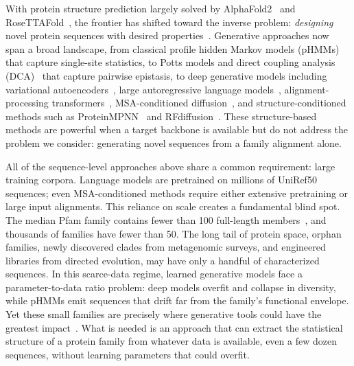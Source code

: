 
With protein structure prediction largely solved by AlphaFold2~\cite{jumperHighlyAccurateProtein2021} and RoseTTAFold~\cite{baekRoseTTAFold2021}, the frontier has shifted toward the inverse problem: \emph{designing} novel protein sequences with desired properties~\cite{kuhlmanBradleyAdvances2019,huangComingAgeDeNovo2016}. Generative approaches now span a broad landscape, from classical profile hidden Markov models (pHMMs)~\cite{hmmer3,kroghHiddenMarkovModels1994} that capture single-site statistics, to Potts models and direct coupling analysis (DCA)~\cite{morcosDirectCouplingAnalysis2011,ekeberg2013improved,trinquierEfficientGenerativeModeling2021} that capture pairwise epistasis, to deep generative models including variational autoencoders~\cite{kingmaWellingAutoEncoding2014,riesselman2018deep,sinaiVariationalAutoEncoding2017}, large autoregressive language models~\cite{ferruzProtGPT2DeepUnsupervised2022,madaniProGenLanguageModeling2023,notinTranception2022}, alignment-processing transformers~\cite{raoMSATransformer2021}, MSA-conditioned diffusion~\cite{alamdariProteinGeneration2023}, and structure-conditioned methods such as ProteinMPNN~\cite{dauparasProteinMPNN2022} and RFdiffusion~\cite{watsonRFdiffusion2023}. These structure-based methods are powerful when a target backbone is available but do not address the problem we consider: generating novel sequences from a family alignment alone.

All of the sequence-level approaches above share a common requirement: large training corpora. Language models are pretrained on millions of UniRef50 sequences; even MSA-conditioned methods require either extensive pretraining or large input alignments. This reliance on scale creates a fundamental blind spot. The median Pfam family contains fewer than 100 full-length members~\cite{mistryPfamProteinFamilies2021}, and thousands of families have fewer than 50. The long tail of protein space, orphan families, newly discovered clades from metagenomic surveys, and engineered libraries from directed evolution, may have only a handful of characterized sequences. In this scarce-data regime, learned generative models face a parameter-to-data ratio problem: deep models overfit and collapse in diversity, while pHMMs emit sequences that drift far from the family's functional envelope. Yet these small families are precisely where generative tools could have the greatest impact~\cite{yangMachineLearningGuided2019}. What is needed is an approach that can extract the statistical structure of a protein family from whatever data is available, even a few dozen sequences, without learning parameters that could overfit.

